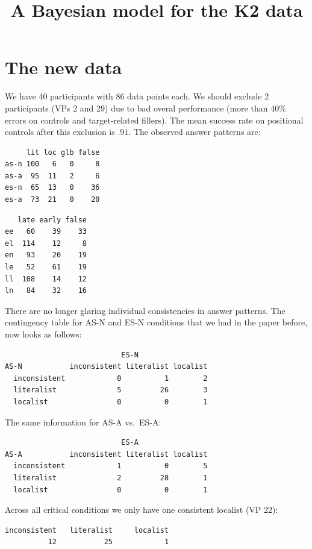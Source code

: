 \documentclass[fleqn,reqno,10pt]{article}
\title{A Bayesian model for the K2 data}
\author{}
\date{}
\begin{document}
\maketitle

\section{The new data}

We have 40 participants with 86 data points each. We should exclude 2
participants (VPs 2 and 29) due to bad overal performance (more than
40\% errors on controls and target-related fillers). The mean success
rate on positional controls after this exclusion is $.91$. The
observed answer patterns are:

\medskip

\begin{minipage}[t]{0.45\linewidth}
\begin{verbatim}
     lit loc glb false
as-n 100   6   0     8
as-a  95  11   2     6
es-n  65  13   0    36
es-a  73  21   0    20
\end{verbatim}
\end{minipage}
\begin{minipage}[t]{0.45\linewidth}
\begin{verbatim}
   late early false
ee   60    39    33
el  114    12     8
en   93    20    19
le   52    61    19
ll  108    14    12
ln   84    32    16
\end{verbatim}
\end{minipage}

\medskip

There are no longer glaring individual consistencies in answer
patterns. The contingency table for AS-N and ES-N conditions that we
had in the paper before, now looks as follows:
\begin{verbatim}
                           ES-N
AS-N           inconsistent literalist localist
  inconsistent            0          1        2
  literalist              5         26        3
  localist                0          0        1
\end{verbatim}
The same information for AS-A vs.~ES-A:
\begin{verbatim}
                           ES-A
AS-A           inconsistent literalist localist
  inconsistent            1          0        5
  literalist              2         28        1
  localist                0          0        1
\end{verbatim}
Across all critical conditions we only have one consistent localist
(VP 22):
\begin{verbatim}
inconsistent   literalist     localist 
          12           25            1 
\end{verbatim}
\end{document}
